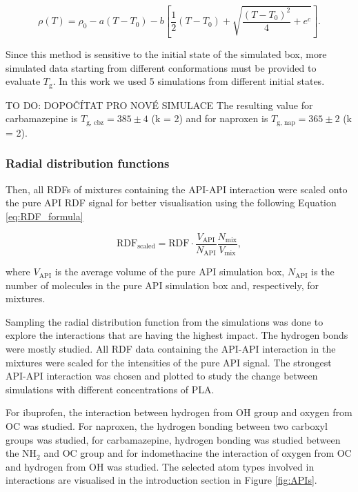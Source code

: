 \begin{equation}\label{eq:fit}
	\rho(T)=\rho_0-a\left(T-T_0\right)-b\left[\frac{1}{2}\left(T-T_0\right)+\sqrt{\frac{\left(T-T_0\right)^2}{4}+e^c}\right].
\end{equation}

Since this method is sensitive to the initial state of the simulated box, more simulated data starting from different conformations must be provided to evaluate $T_\text{g}$. In this work we used 5 simulations from different initial states.

TO DO: DOPOČÍTAT PRO NOVÉ SIMULACE
The resulting value for carbamazepine is $T_{\text{g, cbz}} = 385 \pm 4$ (k = 2) and for naproxen is $T_{\text{g, nap}} = 365 \pm 2$ (k = 2). 

\subsubsection{Radial distribution functions}

Then, all RDFs of mixtures containing the API-API interaction were scaled onto the pure API RDF signal for better visualisation using the following Equation \ref{eq:RDF_formula}

\begin{equation}\label{eq:RDF_formula}
	\text{RDF}_{\text{scaled}} = \text{RDF} \cdot \frac{V_{\text{API}}}{N_{\text{API}}} \frac{N_{\text{mix}}}{V_{\text{mix}}},
\end{equation}

where $V_{\text{API}}$ is the average volume of the pure API simulation box, $N_{\text{API}}$ is the number of molecules in the pure API simulation box and, respectively, for mixtures.

Sampling the radial distribution function from the simulations was done to explore the interactions that are having the highest impact. The hydrogen bonds were mostly studied. All RDF data containing the API-API interaction in the mixtures were scaled for the intensities of the pure API signal. The strongest API-API interaction was chosen and plotted to study the change between simulations with different concentrations of PLA. 

For ibuprofen, the interaction between hydrogen from OH group and oxygen from OC was studied. For naproxen, the hydrogen bonding between two carboxyl groups was studied, for carbamazepine, hydrogen bonding was studied between the N$\text{H}_\text{2}$ and OC group and for indomethacine the interaction of oxygen from OC and hydrogen from OH was studied.  The selected atom types involved in interactions are visualised in the introduction section in Figure \ref{fig:APIs}. 

